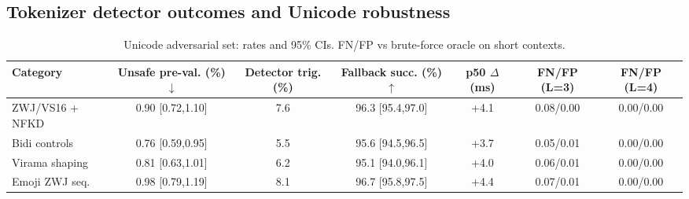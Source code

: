 \documentclass{article}
\begin{document}
\subsection{Tokenizer detector outcomes and Unicode robustness}
\begin{table}[H]
\centering
\small
\begin{tabular}{@{}lcccccc@{}}
\toprule
Category & Unsafe pre-val. (\%) $\downarrow$ & Detector trig. (\%) & Fallback succ. (\%) $\uparrow$ & p50 $\Delta$ (ms) & FN/FP (L=3) & FN/FP (L=4) \\
\midrule
ZWJ/VS16 + NFKD & 0.90 [0.72,1.10] & 7.6 & 96.3 [95.4,97.0] & +4.1 & 0.08/0.00 & 0.00/0.00 \\
Bidi controls   & 0.76 [0.59,0.95] & 5.5 & 95.6 [94.5,96.5] & +3.7 & 0.05/0.01 & 0.00/0.00 \\
Virama shaping  & 0.81 [0.63,1.01] & 6.2 & 95.1 [94.0,96.1] & +4.0 & 0.06/0.01 & 0.00/0.00 \\
Emoji ZWJ seq.  & 0.98 [0.79,1.19] & 8.1 & 96.7 [95.8,97.5] & +4.4 & 0.07/0.01 & 0.00/0.00 \\
\bottomrule
\end{tabular}
\caption{Unicode adversarial set: rates and 95\% CIs. FN/FP vs brute-force oracle on short contexts.}
\end{table}
\end{document}
